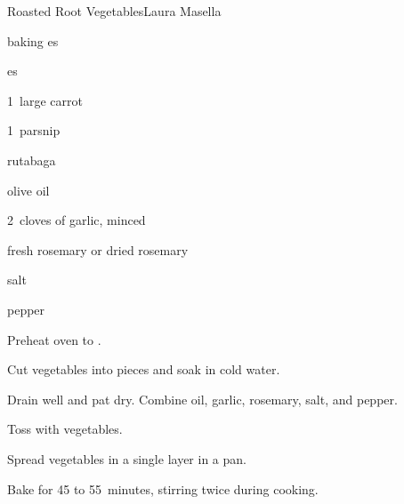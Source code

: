 \begin{recipe}{Roasted Root Vegetables}{Laura Masella}{}

\begin{ingredients}
\item {} baking es
\item {} es
\item 1~large carrot
\item 1~parsnip
\item \lbs{\quarter} rutabaga
\item \Tp{1\half} olive oil
\item 2~cloves of garlic, minced
\item {} fresh rosemary or  dried rosemary
\item \tp{\half} salt
\item \tp{\half} pepper
\end{ingredients}

\begin{directions}
\item Preheat oven to .
\item Cut vegetables into \inch{1\half} pieces and soak in cold water.
\item Drain well and pat dry.
\itme Combine oil, garlic, rosemary, salt, and pepper.
\item Toss with vegetables.
\item Spread vegetables in a single layer in a pan.
\item Bake for 45 to 55~minutes, stirring twice during cooking.
\end{directions}

\end{recipe}
